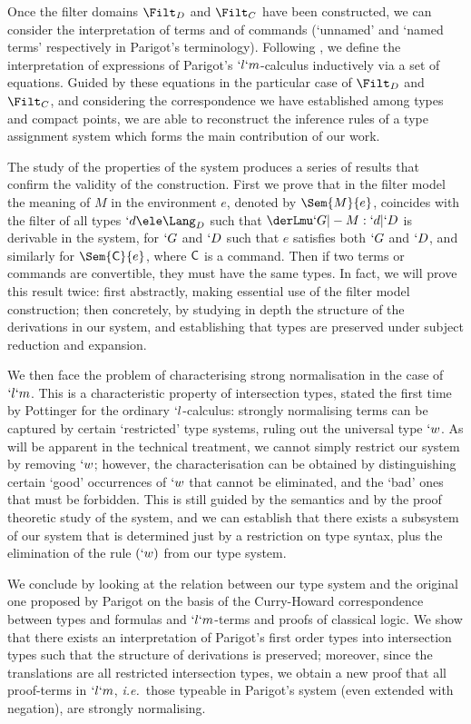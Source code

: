 \documentclass{lmcs}
\def\ie{\emph{i.e.}}
\begin{document}
Once the filter domains $\Filt_D$ and $\Filt_C$ have been constructed, we can consider the interpretation of terms and of commands (`unnamed' and `named terms' respectively in Parigot's terminology). 
Following \cite{Streicher-Reus'98}, we define the interpretation of expressions of Parigot's $`l`m$-calculus inductively via a set of equations.
Guided by these equations in the particular case of $\Filt_D$ and $\Filt_C$, and considering the correspondence we have established among types and compact points, we are able to reconstruct the inference rules of a type assignment system which forms the main contribution of our work.

The study of the properties of the system produces a series of results that confirm the validity of the construction. 
First we prove that in the filter model the meaning of $M$ in the environment $e$, denoted by $\Sem{ M }{ e }$, coincides with the filter of all types $`d\ele \Lang_D$ such that $ \derLmu `G |- M : `d | `D $ is derivable in the system, for $`G$ and $`D $ such that $e$ satisfies both $`G$ and $`D $, and similarly for $\Sem{\Cmd}{ e }$, where $\textrm{\sf C}$ is a command. 
Then if two terms or commands are convertible, they must have the same types. 
In fact, we will prove this result twice: first abstractly, making essential use of the filter model construction; then concretely, by studying in depth the structure of the derivations in our system, and establishing that types are preserved under subject reduction and expansion.

We then face the problem of characterising strong normalisation in the case of $`l`m$. 
This is a characteristic property of intersection types, stated the first time by Pottinger \cite{Pottinger'80} for the ordinary $`l$-calculus: strongly normalising terms can be captured by certain `restricted' type systems, ruling out the universal type $`w$.
As will be apparent in the technical treatment, we cannot simply restrict our system by removing $`w$; however, the characterisation can be obtained by distinguishing certain `good' occurrences of $`w$ that cannot be eliminated, and the `bad' ones that must be forbidden. 
This is still guided by the semantics and by the proof theoretic study of the system, and we can establish that there exists a subsystem of our system that is determined just by a restriction on type syntax, plus the elimination of the rule $(`w)$ from our type system.

We conclude by looking at the relation between our type system and the original one proposed by Parigot \cite{Parigot'92} on the basis of the Curry-Howard correspondence between types and formulas and $`l`m$-terms and proofs of classical logic. 
We show that there exists an interpretation of Parigot's first order types into intersection types such that the structure of derivations is preserved; moreover, since the translations are all restricted intersection types, we obtain a new proof that all proof-terms in $`l`m$, \ie~those typeable in Parigot's system (even extended with negation), are strongly normalising. \\
\end{document}
